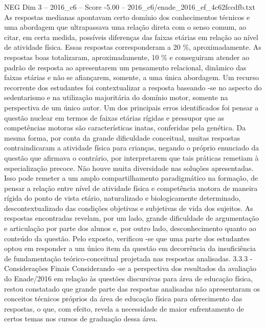 \begin{textsample}{NEG Dim 3 – 2016\_c6 – Score -5.00 – 2016\_c6/enade\_2016\_ef\_4c62fccdfb.txt}
As respostas medianas apontavam certo domínio dos conhecimentos técnicos e uma abordagem que ultrapassava uma relação direta com o senso comum, ao citar, em certa medida, possíveis diferenças das faixas etárias em relação ao nível de atividade física.
Essas respostas corresponderam a 20 \%, aproximadamente.
As respostas boas totalizaram, aproximadamente, 10 \% e conseguiram atender ao padrão de resposta ao apresentarem um pensamento relacional, dinâmico das faixas etárias e não se afiançarem, somente, a uma única abordagem.
Um recurso recorrente dos estudantes foi contextualizar a resposta baseando -se no aspecto do sedentarismo e na utilização majoritária do domínio motor, somente na perspectiva de um único autor.
Um dos principais erros identificados foi pensar a questão nuclear em termos de faixas etárias rígidas e pressupor que as competências motoras são características inatas, conferidas pela genética.
Da mesma forma, por conta da grande dificuldade conceitual, muitas respostas contraindicaram a atividade física para crianças, negando o próprio enunciado da questão que afirmava o contrário, por interpretarem que tais práticas remetiam à especialização precoce.
Não houve muita diversidade nas soluções apresentadas.
Isso pode remeter a um amplo compartilhamento paradigmático na formação, de pensar a relação entre nível de atividade física e competência motora de maneira rígida do ponto de vista etário, naturalizado e biologicamente determinado, descontextualizado das condições objetivas e subjetivas de vida dos sujeitos.
As respostas encontradas revelam, por um lado, grande dificuldade de argumentação e articulação por parte dos alunos e, por outro lado, desconhecimento quanto ao conteúdo da questão.
Pelo exposto, verificou -se que uma parte dos estudantes optou em responder a um único item da questão em decorrência da insuficiência de fundamentação teórico-conceitual projetada nas respostas analisadas. 3.3.3 - Considerações Finais Considerando -se a perspectiva dos resultados da avaliação do Enade/2016 em relação às questões discursivas para área de educação física, restou constatado que grande parte das respostas analisadas não apresentaram os conceitos técnicos próprios da área de educação física para oferecimento das respostas, o que, com efeito, revela a necessidade de maior enfrentamento de certos temas nos cursos de graduação dessa área.

\end{textsample}
